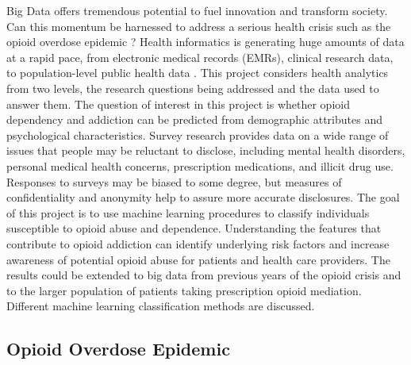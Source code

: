 \documentclass[sigconf]{acmart}
\begin{document}
Big Data offers tremendous potential to fuel innovation and transform society. 
Can this momentum be harnessed to address a serious health crisis such as the 
opioid overdose epidemic \cite{cdc16}? Health informatics is generating huge 
amounts of data at a rapid pace, from electronic medical records (EMRs), 
clinical research data, to population-level public health data \cite{herland14}. 
This project considers health analytics from two levels, the research questions 
being addressed and the data used to answer them. The question of interest in 
this project is whether opioid dependency and addiction can be predicted from 
demographic attributes and psychological characteristics. Survey research 
provides data on a wide range of issues that people may be reluctant to 
disclose, including mental health disorders, personal medical health concerns, 
prescription medications, and illicit drug use. Responses to surveys may be 
biased to some degree, but measures of confidentiality and anonymity help to 
assure more accurate disclosures. The goal of this project is to use machine 
learning procedures to classify individuals susceptible to opioid abuse and 
dependence. Understanding the features that contribute to opioid addiction 
can identify underlying risk factors and increase awareness of potential 
opioid abuse for patients and health care providers. The results could be 
extended to big data from previous years of the opioid crisis and to the 
larger population of patients taking prescription opioid mediation. Different 
machine learning classification methods are discussed.


\subsection{Opioid Overdose Epidemic}
\end{document}
